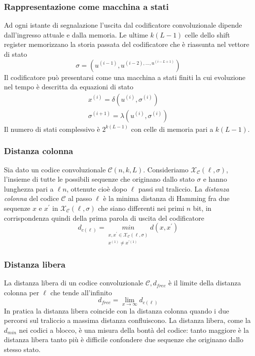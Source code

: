         \subsubsection{Rappresentazione come macchina a stati}
            Ad ogni istante di segnalazione l'uscita dal codificatore convoluzionale dipende 
            dall'ingresso attuale e dalla memoria. Le ultime $k(L-1)$ celle dello shift register memorizzano la 
            storia passata del codificatore che è riassunta nel vettore di stato 
            \[
                \sigma = \left(u^{(i-1)},u^{(i-2),\dots, u^{(i-L+1)}}\right)  
            \]
            Il codificatore può presentarsi come una macchina a stati finiti la cui evoluzione nel tempo
            è descritta da equazioni di stato 
            \begin{gather}
                x^{(i)} = \delta\left(u^{(i)},\sigma^{(i)}\right)\nonumber \\
                \sigma^{(i+1)} = \lambda\left(u^{(i)},\sigma^{(i)}\right)\nonumber 
            \end{gather}
            Il numero di stati complessivo è $2^{k(L-1)}$ con celle di memoria pari a $k(L-1)$.
        \subsubsection{Distanza colonna}
            Sia dato un codice convoluzionale $\mathcal{C}(n,k,L)$. Consideriamo $\mathcal{X}_\mathcal{C}(\ell,\sigma)$, l'insieme
            di tutte le possibili sequenze che originano dallo stato $\sigma$ e hanno lunghezza pari a $\ell n$, ottenute cioè dopo 
            $\ell$ passi sul traliccio. La \emph{distanza colonna} del codice $\mathcal{C}$ al passo $\ell$ è la minima distanza di Hamming
            fra due sequenze $x$ e $x^\prime$ in $\mathcal{X}_\mathcal{C}(\ell,\sigma)$ che siano differenti nei primi $n$ bit, in corrispondenza
            quindi della prima parola di uscita del codificatore 
            \[
                d_{c(\ell)} = \underset{\substack{x,x^\prime \in \mathcal{X}_\mathcal{C}(\ell,\sigma) \\ x^{(1)}\neq x^{\prime(1)} }}{min} d(x,x^\prime)  
            \]
        \subsubsection{Distanza libera}
            La distanza libera di un codice convoluzionale $\mathcal{C},d_{free}$ è il limite della distanza colonna per $\ell$ che tende 
            all'infinito
            \[
                d_{free} = \lim_{x\rightarrow \infty} d_{c(\ell)}  
            \]
            In pratica la distanza libera coincide con la distanza colonna quando i due percorsi sul traliccio a massima distanza confluiscono.
            La distanza libera, come la $d_{min}$ nei codici a blocco, è una misura della bontà del codice: tanto maggiore è la distanza libera 
            tanto più è difficile confondere due sequenze che originano dallo stesso stato.
